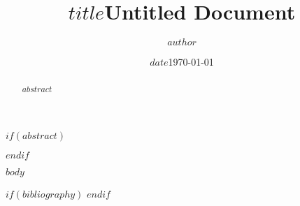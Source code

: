 \documentclass[11pt,a4paper,oneside]{article}
\title{$title$}
\title{Untitled Document}
\author{$author$}
\author{}
\date{$date$}
\date{\today}
\begin{document}
\maketitle

$if(abstract)$
\begin{abstract}
$abstract$
\end{abstract}
$endif$

$body$

$if(bibliography)$
\printbibliography[title=References]
$endif$
\end{document}
